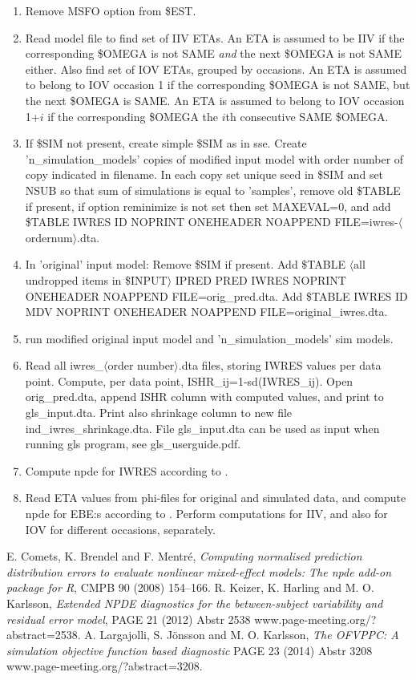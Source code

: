\begin{enumerate}
\item Remove MSFO option from \$EST.
\item Read model file to find set of IIV ETAs. An ETA is assumed to be IIV if the corresponding \$OMEGA is not SAME
\emph{and} the next \$OMEGA is not SAME either. Also find set of IOV ETAs, grouped by occasions.
An ETA is assumed to belong to IOV occasion 1 if the corresponding \$OMEGA is not SAME, but the next \$OMEGA is SAME. 
An ETA is assumed to belong to IOV occasion 1+$i$ if the corresponding \$OMEGA the $i$th consecutive SAME \$OMEGA. 
\item If \$SIM not present, create simple \$SIM as in sse. Create 'n\_simulation\_models' copies of modified
input model with order number of copy indicated in filename. In each copy set unique seed in \$SIM and set
NSUB so that sum of simulations is equal to 'samples', remove old \$TABLE if present, 
if option reminimize is not set then set MAXEVAL=0, and
add \$TABLE IWRES ID NOPRINT ONEHEADER NOAPPEND FILE=iwres-$\langle$ordernum$\rangle$.dta. 
\item In 'original' input model: Remove \$SIM if present. Add \$TABLE $\langle$all undropped items in \$INPUT$\rangle$ IPRED PRED IWRES NOPRINT ONEHEADER NOAPPEND FILE=orig\_pred.dta. Add \$TABLE IWRES ID MDV NOPRINT ONEHEADER NOAPPEND FILE=original\_iwres.dta. 
\item run modified original input model and 'n\_simulation\_models' sim models.
\item Read all iwres\_$\langle$order number$\rangle$.dta files,
storing IWRES values per data point. Compute, per data point, ISHR\_ij=1-sd(IWRES\_ij). Open orig\_pred.dta, append ISHR column with
computed values, and print to gls\_input.dta. Print also shrinkage column to new file ind\_iwres\_shrinkage.dta. File gls\_input.dta
can be used as input when running gls program, see gls\_userguide.pdf. 
\item Compute npde for IWRES according to \cite{Comets}.
\item Read ETA values from 
phi-files for original and simulated data, and compute npde for EBE:s according to \cite{Comets}.
Perform computations for IIV, and also for IOV for different occasions, separately. 
\end{enumerate}

\begin{thebibliography}{99}
 E. Comets, K. Brendel and F. Mentré,
{\em Computing normalised prediction distribution errors to evaluate nonlinear mixed-effect models: The npde add-on package for R},
CMPB 90 (2008) 154–166.
 R. Keizer, K. Harling and M. O. Karlsson,
{\em Extended NPDE diagnostics for the between-subject variability and residual error model},
PAGE 21 (2012) Abstr 2538 \mbox{www.page-meeting.org/?abstract=2538}.
 A. Largajolli, S. Jönsson and M. O. Karlsson,
{\em The OFVPPC: A simulation objective function based diagnostic}
PAGE 23 (2014) Abstr 3208 \mbox{www.page-meeting.org/?abstract=3208}.
\end{thebibliography}     




